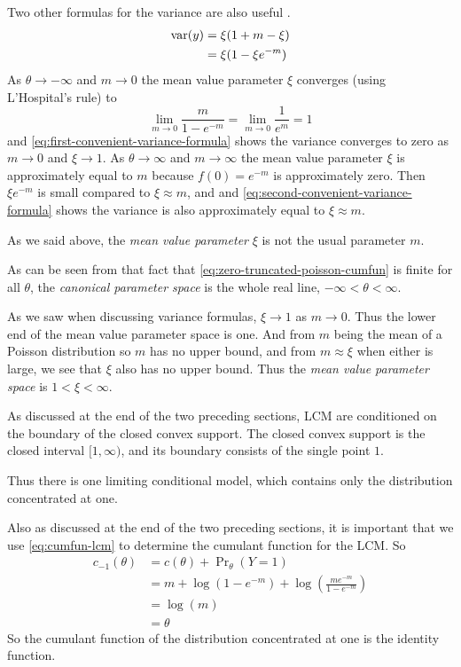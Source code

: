 Two other formulas for the variance are also useful \citep{geyer-3701}.
\begin{subequations}
\begin{align}
   \operatorname{var}(y) & = \xi (1 + m - \xi)
   \label{eq:first-convenient-variance-formula}
   \\
   & = \xi (1 - \xi e^{- m})
   \label{eq:second-convenient-variance-formula}
\end{align}
\end{subequations}
As $\theta \to - \infty$ and $m \to 0$ the mean value parameter $\xi$ converges
(using L'Hospital's rule) to
$$
   \lim_{m \to 0} \frac{m}{1 - e^{- m}} = \lim_{m \to 0} \frac{1}{e^{m}} = 1
$$
and \eqref{eq:first-convenient-variance-formula} shows the variance converges
to zero as $m \to 0$ and $\xi \to 1$.
As $\theta \to \infty$ and $m \to \infty$ the mean value parameter $\xi$
is approximately equal to $m$ because $f(0) = e^{- m}$ is approximately zero.
Then $\xi e^{- m}$ is small compared to $\xi \approx m$, and
and \eqref{eq:second-convenient-variance-formula} shows the variance is
also approximately equal to $\xi \approx m$.

As we said above, the \emph{mean value parameter} $\xi$ is not
the usual parameter $m$.

As can be seen from that fact that \eqref{eq:zero-truncated-poisson-cumfun}
is finite for all $\theta$,
the \emph{canonical parameter space} is
the whole real line, $- \infty < \theta < \infty$.

As we saw when discussing variance formulas, $\xi \to 1$ as $m \to 0$.
Thus the lower end of the mean value parameter space is one.
And from $m$ being the mean of a Poisson distribution so $m$ has
no upper bound, and from $m \approx \xi$ when either is large, we see that
$\xi$ also has no upper bound.  Thus
the \emph{mean value parameter space} is $1 < \xi < \infty$.

As discussed at the end of the two preceding sections, LCM
are conditioned on the boundary of the closed convex support.
The closed convex support is the closed interval $[1, \infty)$, and its
boundary consists of the single point $1$.

Thus there is one limiting conditional model, which contains only
the distribution concentrated at one.

Also as discussed at the end of the two preceding sections,
it is important that we use \eqref{eq:cumfun-lcm} to determine the cumulant
function for the LCM.  So
\begin{align*}
   c_{- 1}(\theta)
   & =
   c(\theta) + \Pr\nolimits_\theta(Y = 1)
   \\
   & =
   m + \log(1 - e^{- m})
   +
   \log \left(\frac{m e^{- m}}{1 - e^{- m}}\right)
   \\
   & =
   \log(m)
   \\
   & =
   \theta
\end{align*}
So the cumulant function of the distribution concentrated at one is the
identity function.

